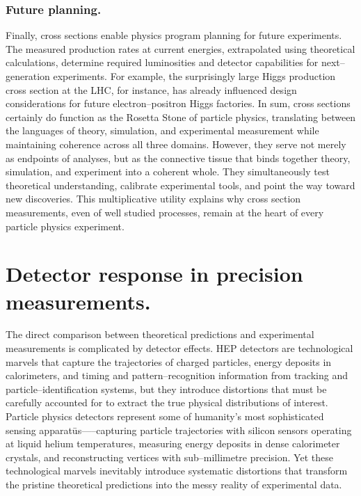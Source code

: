             \subsubsection{Future planning.}
                Finally, cross sections enable physics program planning for future experiments.
                The measured production rates at current energies, extrapolated using theoretical calculations, determine required luminosities and detector capabilities for next--generation experiments.
                For example, the surprisingly large Higgs production cross section at the LHC, for instance, has already influenced design considerations for future electron--positron Higgs factories.           
    In sum, cross sections certainly do function as the Rosetta Stone of particle physics, translating between the languages of theory, simulation, and experimental measurement while maintaining coherence across all three domains.
    However, they serve not merely as endpoints of analyses, but as the connective tissue that binds together theory, simulation, and experiment into a coherent whole.
    They simultaneously test theoretical understanding, calibrate experimental tools, and point the way toward new discoveries.
    This multiplicative utility explains why cross section measurements, even of well studied processes, remain at the heart of every particle physics experiment.

\section{Detector response in precision measurements.}
    The direct comparison between theoretical predictions and experimental measurements is complicated by detector effects.
    HEP detectors are technological marvels that capture the trajectories of charged particles, energy deposits in calorimeters, and timing and pattern--recognition information from tracking and particle--identification systems, but they introduce distortions that must be carefully accounted for to extract the true physical distributions of interest.
    Particle physics detectors represent some of humanity's most sophisticated sensing apparat\=us—--capturing particle trajectories with silicon sensors operating at liquid helium temperatures, measuring energy deposits in dense calorimeter crystals, and reconstructing vertices with sub--millimetre precision.
    Yet these technological marvels inevitably introduce systematic distortions that transform the pristine theoretical predictions into the messy reality of experimental data.
    
